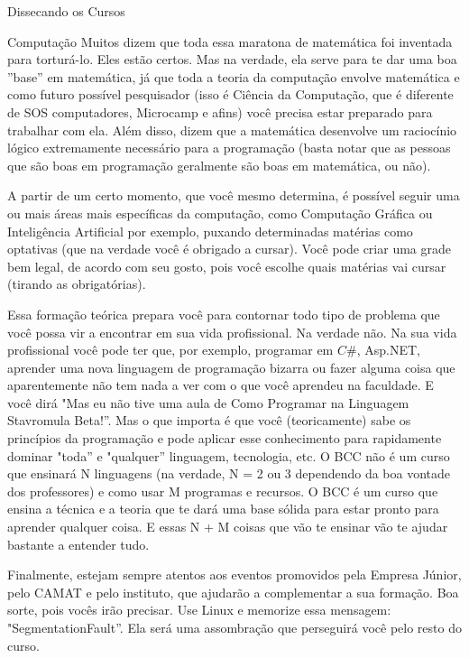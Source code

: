 \begin{secao}{Dissecando os Cursos}
\begin{subsecao}{Computação}
Muitos dizem que toda essa maratona de matemática foi inventada para torturá-lo. Eles estão certos. Mas na verdade, ela serve para te dar uma boa ''base'' em matemática, já que toda a teoria da computação envolve matemática e como futuro possível pesquisador (isso é Ciência da Computação, que é diferente de SOS computadores, Microcamp e afins) você precisa estar preparado para trabalhar com ela. Além disso, dizem que a matemática desenvolve um raciocínio lógico extremamente necessário para a programação (basta notar que as pessoas que são boas em programação geralmente são boas em matemática, ou não).

A partir de um certo momento, que você mesmo determina, é possível seguir uma ou mais áreas mais específicas da computação, como Computação Gráfica ou Inteligência Artificial por exemplo, puxando determinadas matérias como optativas (que na verdade você é obrigado a cursar). Você pode criar uma grade bem legal, de acordo com seu gosto, pois você escolhe quais matérias vai cursar (tirando as obrigatórias).

Essa formação teórica prepara você para contornar todo tipo de problema que você possa vir a encontrar em sua vida profissional. Na verdade não. Na sua vida profissional você pode ter que, por exemplo, programar em $C\#$, Asp.NET, aprender uma nova linguagem de programação bizarra ou fazer alguma coisa que aparentemente não tem nada a ver com o que você aprendeu na faculdade. E você dirá "Mas eu não tive uma aula de Como Programar na Linguagem Stavromula Beta!”. Mas o que importa é que você (teoricamente) sabe os princípios da programação e pode aplicar esse conhecimento para rapidamente dominar "toda” e "qualquer” linguagem, tecnologia, etc. O BCC não é um curso que ensinará N linguagens (na verdade, N = 2 ou 3 dependendo da boa vontade dos professores) e como usar M programas e recursos. O BCC é um curso que ensina a técnica e a teoria que te dará uma base sólida para estar pronto para aprender qualquer coisa. E essas N + M coisas que vão te ensinar vão te ajudar bastante a entender tudo.

Finalmente, estejam sempre atentos aos eventos promovidos pela Empresa Júnior, pelo CAMAT e pelo instituto, que ajudarão a complementar a sua formação. Boa sorte, pois vocês irão precisar. Use Linux e memorize essa mensagem: "SegmentationFault”. Ela será uma assombração que perseguirá você pelo resto do curso.



\end{subsecao}


\end{secao}
